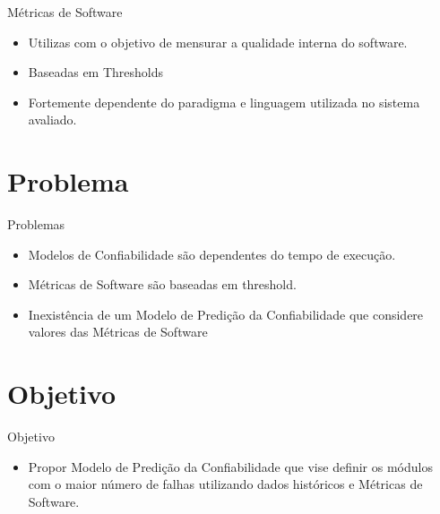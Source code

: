 \documentclass[t,14pt,mathserif]{beamer}
\begin{document}
\begin{frame}{Métricas de Software}

	\begin{itemize}
		
		\item Utilizas com o objetivo de mensurar a qualidade interna do software.
		\item Baseadas em Thresholds
		\item Fortemente dependente do paradigma e linguagem utilizada no sistema avaliado.	
	\end{itemize}


\end{frame}
\section{Problema}
\begin{frame}{Problemas}

	\begin{itemize}
		\item Modelos de Confiabilidade são dependentes do tempo de execução.
		\item Métricas de Software são baseadas em threshold.
		\item Inexistência de um \alert{Modelo de Predição da Confiabilidade} que considere valores das \alert{Métricas de Software}
	\end{itemize}

\end{frame}
\section{Objetivo}
\begin{frame}{Objetivo}

	\begin{itemize}
		\item Propor \alert{Modelo de Predição da Confiabilidade} que vise definir os módulos com o maior número de falhas utilizando \alert{dados históricos} e \alert{Métricas de Software}.
	\end{itemize}

\end{frame}
\end{document}
